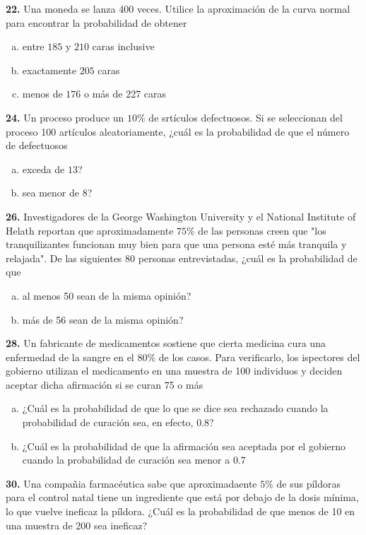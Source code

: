 \documentclass[12pt, letterpaper]{article}
\begin{document}
    \textbf{22. }Una moneda se lanza 400 veces. Utilice la aproximación de la curva normal para encontrar la probabilidad
    de obtener
        \begin{enumerate}[a)]
            \item entre $185$ y $210$ caras inclusive
            \item exactamente $205$ caras
            \item menos de $176$ o más de $227$ caras
        \end{enumerate}\vskip1cm

    \textbf{24. }Un proceso produce un $10\%$ de srtículos defectuosos. Si se seleccionan del proceso 100 artículos
    aleatoriamente, ¿cuál es la probabilidad de que el número de defectuosos
        \begin{enumerate}[a)]
            \item exceda de $13$?
            \item sea menor de $8$?
        \end{enumerate}\vskip1cm

    \textbf{26. }Investigadores de la George Washington University y el National Institute of Helath reportan que
    aproximadamente $75\%$ de las personas creen que "los tranquilizantes funcionan muy bien para que una persona esté
    más tranquila y relajada". De las siguientes 80 personas entrevistadas, ¿cuál es la probabilidad de que
        \begin{enumerate}[a)]
            \item al menos 50 sean de la misma opinión?
            \item más de 56 sean de la misma opinión?
        \end{enumerate}\vskip1cm

    \textbf{28. }Un fabricante de medicamentos sostiene que cierta medicina cura una enfermedad de la sangre en el $80\%$
    de los casos. Para verificarlo, los ispectores del gobierno utilizan el medicamento en una muestra de 100 individuos y
    deciden aceptar dicha afirmación si se curan 75 o más
        \begin{enumerate}[a)]
            \item ¿Cuál es la probabilidad de que lo que se dice sea rechazado cuando la probabilidad de curación sea,
                  en efecto, 0.8?
            \item ¿Cuál es la probabilidad de que la afirmación sea aceptada por el gobierno cuando la probabilidad de
                  curación sea menor a 0.7
        \end{enumerate}\vskip1cm

    \textbf{30. }Una compañia farmacéutica sabe que aproximadaente $5\%$ de sus píldoras para el control natal tiene un
    ingrediente que está por debajo de la dosis mínima, lo que vuelve ineficaz la píldora. ¿Cuál es la probabilidad de que
    menos de 10 en una muestra de 200 sea ineficaz?
\end{document}
